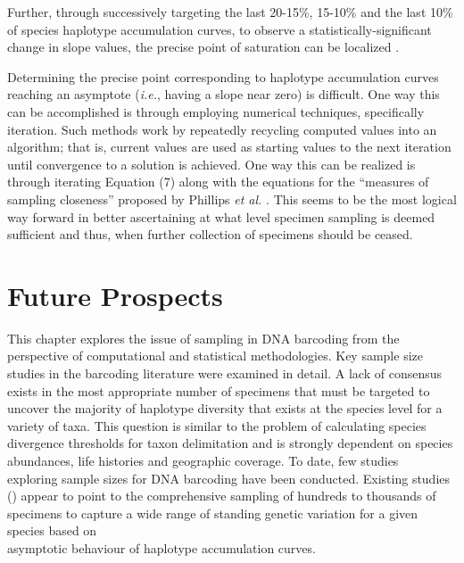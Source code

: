 Further, through successively targeting the last 20-15\%, 15-10\% and the last 10\% of species haplotype accumulation curves, to observe a statistically-significant change in slope values, the precise point of saturation can be localized \cite{phillips2015exploration}.



Determining the precise point corresponding to haplotype accumulation curves \\ reaching an asymptote (\textit{i.e.}, having a slope near zero) is difficult. One way this can be accomplished is through employing numerical techniques, specifically iteration. Such methods work by repeatedly recycling computed values into an algorithm; that is, current values are used as starting values to the next iteration until convergence to a solution is achieved. One way this can be realized is through iterating Equation (7) along with the equations for the ``measures of sampling closeness'' proposed by Phillips \textit{et al.} \cite{phillips2015exploration}. This seems to be the most logical way forward in better ascertaining at what level specimen sampling is deemed sufficient and thus, when further collection of specimens should be ceased.

\section{Future Prospects}


This chapter explores the issue of sampling in DNA barcoding from the perspective of computational and statistical methodologies. Key sample size studies in the barcoding literature were examined in detail. A lack of consensus exists in the most appropriate number of specimens that must be targeted to uncover the majority of haplotype diversity that exists at the species level for a variety of taxa. This question is similar to the problem of calculating species divergence thresholds for taxon delimitation and is strongly dependent on species abundances, life histories and geographic coverage. To date, few studies \\ exploring sample sizes for DNA barcoding have been conducted. Existing studies (\cite{phillips2015exploration, zhang2010estimating}) appear to point to the comprehensive sampling of hundreds to thousands of specimens to capture a wide range of standing genetic variation for a given species based on \\ asymptotic behaviour of haplotype accumulation curves.



